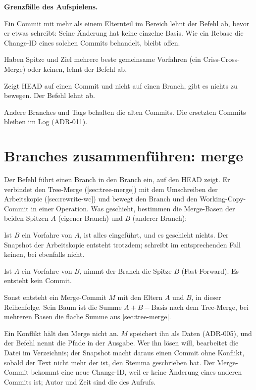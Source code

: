 \startinfobox
{\bf Grenzfälle des Aufspielens.}
\startitemize
\item Ein Commit mit mehr als einem Elternteil im Bereich lehnt der Befehl ab,
bevor er etwas schreibt: Seine Änderung hat keine einzelne Basis.
Wie ein Rebase die Change-ID eines solchen Commits behandelt, bleibt offen.
\item Haben Spitze und Ziel mehrere beste gemeinsame Vorfahren (ein Criss-Cross-Merge)
oder keinen, lehnt der Befehl ab.
\item Zeigt HEAD auf einen Commit und nicht auf einen Branch, gibt es nichts zu bewegen.
Der Befehl lehnt ab.
\item Andere Branches und Tags behalten die alten Commits.
Die ersetzten Commits bleiben im Log (ADR-011).
\stopitemize
\stopinfobox

\section[sec:merge-command]{Branches zusammenführen: merge}

Der Befehl  führt einen Branch in den Branch ein, auf den HEAD zeigt.
Er verbindet den Tree-Merge ([sec:tree-merge]) mit dem Umschreiben der
Arbeitskopie ([sec:rewrite-wc]) und bewegt den Branch und den
Working-Copy-Commit in einer Operation.
Was geschieht, bestimmen die Merge-Basen der beiden Spitzen $A$ (eigener Branch) und $B$ (anderer
Branch):

\startitemize
\item Ist $B$ ein Vorfahre von $A$, ist alles eingeführt, und es geschieht nichts.
Der Snapshot der Arbeitskopie entsteht trotzdem;
 schreibt im entsprechenden Fall keinen,  bei 
ebenfalls nicht.
\item Ist $A$ ein Vorfahre von $B$, nimmt der Branch die Spitze $B$ (Fast-Forward).
Es entsteht kein Commit.
\item Sonst entsteht ein Merge-Commit $M$ mit den Eltern $A$ und $B$, in dieser Reihenfolge.
Sein Baum ist die Summe $A + B - \mathrm{Basis}$ nach dem Tree-Merge,
bei mehreren Basen die flache Summe aus [sec:tree-merge].
\stopitemize

Ein Konflikt hält den Merge nicht an.
$M$ speichert ihn als Daten (ADR-005), und der Befehl nennt die Pfade in der Ausgabe.
Wer ihn lösen will, bearbeitet die Datei im Verzeichnis; der Snapshot macht daraus einen
Commit ohne Konflikt, sobald der Text nicht mehr der ist, den Stemma geschrieben hat.
Der Merge-Commit bekommt eine neue Change-ID, weil er keine Änderung eines anderen Commits ist;
Autor und Zeit sind die des Aufrufs.

